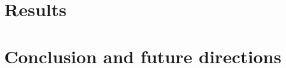 \documentclass{bmcart}
\begin{document}
\section{Results }
\label{sec:results}


\section{Conclusion and future directions}
\label{sec:ccl}




\end{document}
